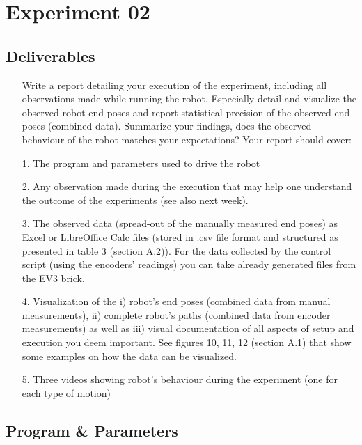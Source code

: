 

    \chapter{Experiment 02}
    \section{Deliverables}
    \begin{itemize}
        \item[] Write a report detailing your execution of the experiment, including all observations made while running the robot. Especially detail and visualize the observed robot end poses and report statistical precision of the observed end poses (combined data). Summarize your findings, does the observed behaviour of the robot matches your expectations? Your report should cover:
    \end{itemize}
    
    \begin{itemize}
        \item[1.] The program and parameters used to drive the robot
        \item[2.] Any observation made during the execution that may help one understand the outcome of the experiments (see also next week).
        \item[3.] The observed data (spread-out of the manually measured end poses) as Excel or LibreOffice Calc files (stored in .csv file format and structured as presented in table 3 (section A.2)). For the data collected by the control script (using the encoders’ readings) you can take already generated files from the EV3 brick.
        \item[4.] Visualization of the i) robot’s end poses (combined data from manual measurements), ii) complete robot’s paths (combined data from encoder measurements) as well as iii) visual documentation of all aspects of setup and execution you deem important. See figures 10, 11, 12 (section A.1) that show some examples on how the data can be visualized.
        \item[5.] Three videos showing robot’s behaviour during the experiment (one for each type of motion)
    \end{itemize}
    
    \section{Program \& Parameters}
    
